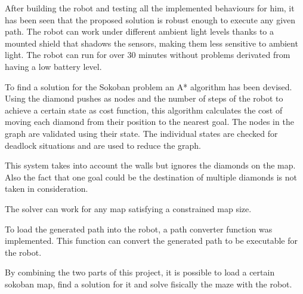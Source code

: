 
After building the robot and testing all the implemented behaviours for him, it has been seen that the proposed solution is robust enough to execute any given path.
The robot can work under different ambient light levels thanks to a mounted shield that shadows the sensors, making them less sensitive to ambient light.
The robot can run for over 30 minutes without problems derivated from having a low battery level.

To find a solution for the Sokoban problem an A* algorithm has been devised.
Using the diamond pushes as nodes and the number of steps of the robot to achieve a certain state as cost function, this algorithm calculates the cost of moving each diamond from their position to the nearest goal.
The nodes in the graph are validated using their state.
The individual states are checked for deadlock situations and are used to reduce the graph.

This system takes into account the walls but ignores the diamonds on the map. 
Also the fact that one goal could be the destination of multiple diamonds is not taken in consideration.

The solver can work for any map satisfying a constrained map size.

To load the generated path into the robot, a path converter function was implemented.
This function can convert the generated path to be executable for the robot.

By combining the two parts of this project, it is possible to load a certain sokoban map, find a solution for it and solve fisically the maze with the robot.

